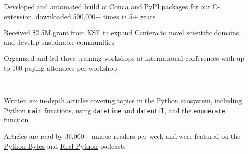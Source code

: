 \begin{tightemize}
\item Developed and automated build of Conda and PyPI packages for our C-extension, downloaded 500,000+ times in 5+ years
\item Received \$2.5M grant from NSF to expand Cantera to novel scientific domains and develop sustainable communities
\item Organized and led three training workshops at international conferences with up to 100 paying attendees per workshop
\end{tightemize}
\sectionsep

\\
\begin{tightemize}
\item Written six in-depth articles covering topics in the Python ecosystem, including \href{https://realpython.com/python-main-function/}{Python \texttt{main} functions}, \href{https://realpython.com/python-datetime/}{using \texttt{datetime} and \texttt{dateutil}}, and \href{https://realpython.com/python-enumerate/}{the \texttt{enumerate} function}
\item Articles are read by 30,000+ unique readers per week and were featured on the \href{https://pythonbytes.fm/episodes/show/151/certified-it-works-on-my-machine}{Python Bytes} and \href{https://realpython.com/podcasts/rpp/21/}{Real Python} podcasts
\end{tightemize}
\sectionsep

